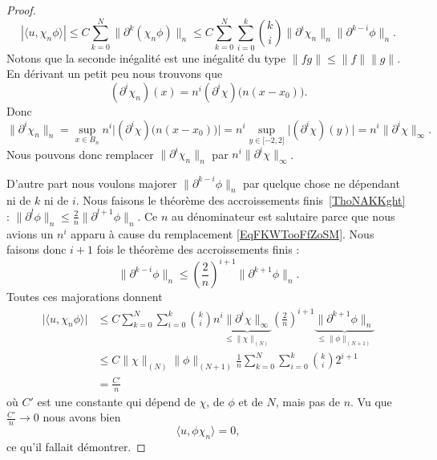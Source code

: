 \begin{proof}
\begin{equation}
		| \langle u, \chi_n\phi\rangle  |\leq C\sum_{k=0}^N\| \partial^k(\chi_n\phi) \|_n\leq C\sum_{k=0}^N\sum_{i=0}^k\binom{ k }{ i }\| \partial^i\chi_n \|_n\| \partial^{k-i}\phi \|_n.
	\end{equation}
	Notons que la seconde inégalité est une inégalité du type \( \| fg \|\leq \| f \|\| g \|\). En dérivant un petit peu nous trouvons que
	\begin{equation}
		(\partial^i\chi_n)(x)=n^i(\partial^i\chi)\big( n(x-x_0) \big).
	\end{equation}
	Donc
	\begin{equation}    \label{EqFKWTooFfZoSM}
		\| \partial^i\chi_n \|_n=\sup_{x\in B_n}n^i\big| (\partial^i\chi)\big( n(x-x_0) \big) \big|=n^i\sup_{y\in\mathopen[ -2 , 2 \mathclose]}\big| (\partial^i\chi)(y) \big|=n^i\| \partial^i\chi \|_{\infty}.
	\end{equation}
	Nous pouvons donc remplacer \( \| \partial^i\chi_n \|_n\) par \( n^i\| \partial^i\chi \|_{\infty}\).

	D'autre part nous voulons majorer \( \| \partial^{k-i}\phi \|_n\) par quelque chose ne dépendant ni de \( k\) ni de \( i\). Nous faisons le théorème des accroissements finis~\ref{ThoNAKKght} : \( \| \partial^l\phi \|_n\leq \frac{ 2 }{ n }\| \partial^{l+1}\phi \|_n\). Ce \( n\) au dénominateur est salutaire parce que nous avions un \( n^i\) apparu à cause du remplacement \eqref{EqFKWTooFfZoSM}. Nous faisons donc \( i+1\) fois le théorème des accroissements finis :
	\begin{equation}
		\| \partial^{k-i} \phi\|_n\leq \left( \frac{ 2 }{ n } \right)^{i+1}\| \partial^{k+1}\phi \|_n.
	\end{equation}
	Toutes ces majorations donnent
	\begin{subequations}
		\begin{align}
			\big| \langle u, \chi_n\phi\rangle  \big| & \leq C\sum_{k=0}^N\sum_{i=0}^k\binom{ k }{ i }n^i\underbrace{\| \partial^i\chi \|_{\infty}}_{\leq \| \chi \|_{(N)}}\left( \frac{ 2 }{ n } \right)^{i+1}  \underbrace{\|  \partial^{k+1}\phi \|_n}_{\leq \| \phi \|_{(N+1)}} \\
			                                          & \leq C\| \chi \|_{(N)}\| \phi \|_{(N+1)}\frac{1}{ n }\sum_{k=0}^N\sum_{i=0}^k\binom{ k }{ i }2^{i+1}                                                                                                                        \\
			                                          & =\frac{ C' }{ n }
		\end{align}
	\end{subequations}
	où \( C'\) est une constante qui dépend de \( \chi\), de \( \phi\) et de \( N\), mais pas de \( n\). Vu que \( \frac{ C' }{ n }\to 0\) nous avons bien
	\begin{equation}
		\langle u, \phi\chi_n\rangle=0,
	\end{equation}
	ce qu'il fallait démontrer.
\end{proof}


